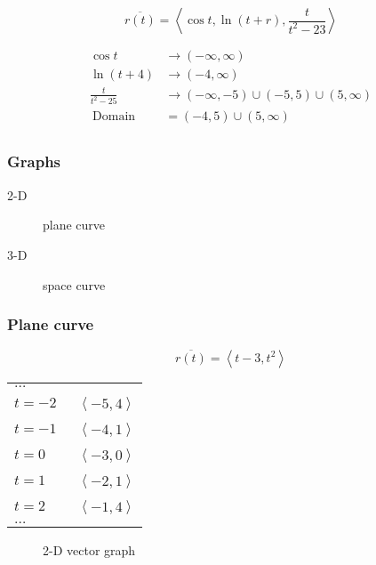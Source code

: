 \begin{example}[Domain]
	\[\overline{r(t)} = \left< \cos t, \ln(t+r), \frac{t}{t^2-23} \right>\]
\end{example}

\begin{align*}
	\cos t &\to (-\infty,\infty) \\
	\ln(t+4) &\to (-4, \infty) \\
	\frac{t}{t^2-25} &\to (-\infty,-5) \cup (-5,5) \cup(5,\infty)\\
	\:\text{Domain}\: &= (-4,5)\cup(5,\infty) \\
\end{align*}

\subsubsection{Graphs}%
\label{ssub:graphs}

\begin{description}
	\item[2-D] plane curve
		\item[3-D] space curve
\end{description}

\subsubsection{Plane curve}%
\label{ssub:plane_curve}


\[\overline{r(t)} = \left<t-3, t^2 \right>\]

\begin{table}[htpb]
	\centering
	\label{tab:label}
	\begin{tabular}{l | r}
		$\ldots$ \\
	$t=-2$ & \ $\left<-5,4 \right>$ \\
	$t=-1$ & \ $\left<-4,1 \right>$ \\
	$t=0$ & \ $\left<-3,0 \right>$ \\
	$t=1$ & \ $\left<-2, 1 \right>$ \\
	$t=2$ & \ $\left<-1, 4 \right>$ \\
		$\ldots$ \\
	\end{tabular}
\end{table}
\begin{figure}[ht]
    \centering
    \caption{2-D vector graph}
    \label{fig:2-d-vector-graph}
\end{figure}

